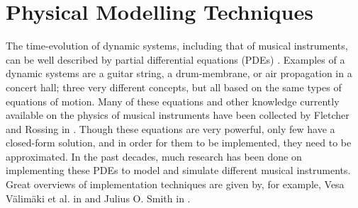 \section{Physical Modelling Techniques}\label{sec:physModTech}
The time-evolution of dynamic systems, including that of musical instruments, can be well described by partial differential equations (PDEs) \cite{Fletcher1998, theBible}. Examples of a dynamic systems are a guitar string, a drum-membrane, or air propagation in a concert hall; three very different concepts, but all based on the same types of equations of motion. Many of these equations and other knowledge currently available on the physics of musical instruments have been collected by Fletcher and Rossing in \cite{Fletcher1998}. Though these equations are very powerful, only few have a closed-form solution, and in order for them to be implemented, they need to be approximated. In the past decades, much research has been done on implementing these PDEs to model and simulate different musical instruments. Great overviews of implementation techniques are given by, for example, Vesa V{\"a}lim{\"a}ki et al. in \cite{Valimaki2006} and Julius O. Smith in \cite{Smith2010a, Smith2010b}. 
\\

